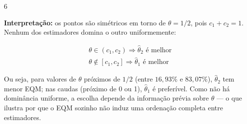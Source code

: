 \documentclass[8pt, a4paper, landscape]{extarticle}
\begin{document}
\begin{multicols}{6}
\vspace{0.2cm}

\textbf{Interpretação:} os pontos são simétricos em torno de $\theta = 1/2$, pois $c_1 + c_2 = 1$. Nenhum dos estimadores domina o outro uniformemente:

\begin{equation*}
\begin{split}
&\theta \in (c_1, c_2) \Rightarrow \hat{\theta}_2 \text{ é melhor} \\
&\theta \notin [c_1, c_2] \Rightarrow \hat{\theta}_1 \text{ é melhor}
\end{split}
\end{equation*}

Ou seja, para valores de $\theta$ próximos de $1/2$ (entre $16,93\%$ e $83,07\%$), $\hat{\theta}_2$ tem menor EQM; nas caudas (próximo de 0 ou 1), $\hat{\theta}_1$ é preferível. Como não há dominância uniforme, a escolha depende da informação prévia sobre $\theta$ — o que ilustra por que o EQM sozinho não induz uma ordenação completa entre estimadores.







\end{multicols}
\end{document}
